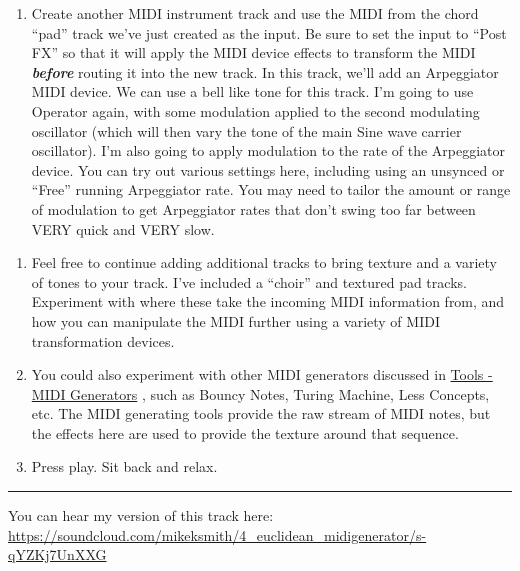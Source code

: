 \documentclass[
  12pt,
  letterpaper,
  oneside,
  open=any]{scrbook}
\makeatletter
\providecommand{\tightlist}{%
  \setlength{\itemsep}{0pt}\setlength{\parskip}{0pt}}\usepackage{longtable,booktabs,array}
\newcommand*\pandocbounded[1]{%
  \sbox\pandoc@box{#1}%
  \Gscale@div\@tempa{\textheight}{\dimexpr\ht\pandoc@box+\dp\pandoc@box\relax}%
  \Gscale@div\@tempb{\linewidth}{\wd\pandoc@box}%
  \ifdim\@tempb\p@<\@tempa\p@\let\@tempa\@tempb\fi%
  \ifdim\@tempa\p@<\p@\scalebox{\@tempa}{\usebox\pandoc@box}%
  \else\usebox{\pandoc@box}%
  \fi%
}
\makeatother
\begin{document}
\begin{enumerate}
\def\labelenumi{\arabic{enumi}.}
\setcounter{enumi}{3}
\tightlist
\item
  Create another MIDI instrument track and use the MIDI from the chord
  ``pad'' track we've just created as the input. Be sure to set the
  input to ``Post FX'' so that it will apply the MIDI device effects to
  transform the MIDI \textbf{\emph{before}} routing it into the new
  track. In this track, we'll add an Arpeggiator MIDI device. We can use
  a bell like tone for this track. I'm going to use Operator again, with
  some modulation applied to the second modulating oscillator (which
  will then vary the tone of the main Sine wave carrier oscillator). I'm
  also going to apply modulation to the rate of the Arpeggiator device.
  You can try out various settings here, including using an unsynced or
  ``Free'' running Arpeggiator rate. You may need to tailor the amount
  or range of modulation to get Arpeggiator rates that don't swing too
  far between VERY quick and VERY slow.
\end{enumerate}

\pandocbounded{\texttt{[image: images/Recipe4\_Arp.png]}}

\begin{enumerate}
\def\labelenumi{\arabic{enumi}.}
\setcounter{enumi}{4}
\item
  Feel free to continue adding additional tracks to bring texture and a
  variety of tones to your track. I've included a ``choir'' and textured
  pad tracks. Experiment with where these take the incoming MIDI
  information from, and how you can manipulate the MIDI further using a
  variety of MIDI transformation devices.
\item
  You could also experiment with other MIDI generators discussed in
  \hyperref[Chapter-012-Tools-MIDI_Generators]{Tools - MIDI Generators}
  , such as Bouncy Notes, Turing Machine, Less Concepts, etc. The MIDI
  generating tools provide the raw stream of MIDI notes, but the effects
  here are used to provide the texture around that sequence.
\item
  Press play. Sit back and relax.
\end{enumerate}

\begin{center}\rule{0.5\linewidth}{0.5pt}\end{center}

You can hear my version of this track here:
\href{https://soundcloud.com/mikeksmith/4_euclidean_midigenerator/s-qYZKj7UnXXG?in=mikeksmith/sets/the-lazy-producer-recipes/s-PGMEWqfwKGz&si=6b1ee90238dd4a3c9fe75f66fd1f6623&utm_source=clipboard&utm_medium=text&utm_campaign=social_sharing}{https://soundcloud.com/mikeksmith/4\_euclidean\_midigenerator/s-qYZKj7UnXXG}
\end{document}
